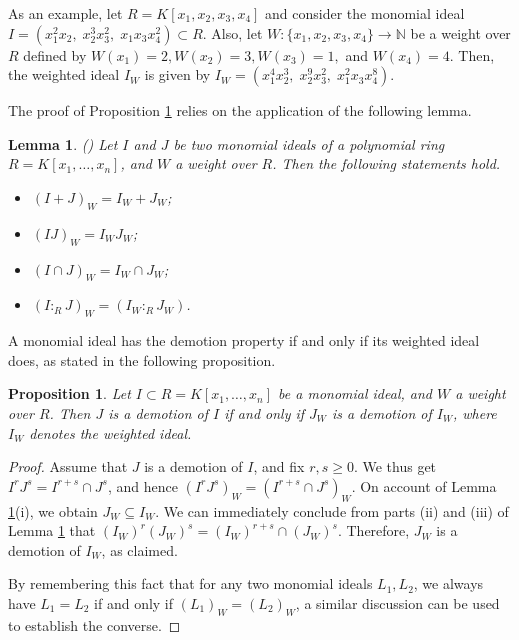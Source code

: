 \documentclass[11pt]{amsart}
\newtheorem{lemma}[theorem]{Lemma}
\newtheorem{proposition}[theorem]{Proposition}
\begin{document}

As an example,  let  $R = K[x_1, x_2, x_3, x_4]$ and consider the monomial ideal $I = (x_1^2x_2,\; x_2^3x_3^2,\; x_1x_3x_4^2) \subset R.$ 
 Also, let $W : \{x_1, x_2, x_3, x_4\} \rightarrow \mathbb{N}$  be a weight over $R$ defined by 
$W(x_1)=2,   W(x_2)=3,  W(x_3)=1,$ and $W(x_4)=4.$  Then, the weighted ideal $I_W$ is given by 
$I_W = (x_1^4x_2^3,\; x_2^9x_3^2,\; x_1^2x_3x_4^8).$

\bigskip
The proof of  Proposition \ref{PRO.Weighting} relies on the application of the following lemma.  

\begin{lemma}\label{LEM. Weighted} (\cite[Lemma 3.5]{SN})
Let $I$ and $J$ be two monomial ideals of a polynomial ring $R=K[x_1, \ldots, x_n]$, and $W$ a weight over $R$. Then the following statements hold. 
\begin {itemize}
\item[(i)] $(I+J)_W= I_W + J_W$;
\item[(ii)] $(IJ)_W= I_W J_W$;
\item[(iii)] $(I\cap J)_W= I_W \cap J_W$;
\item[(iv)] $(I :_RJ)_W= (I_W :_R J_W)$.
\end{itemize}
\end{lemma}

 
 
 A monomial ideal has the demotion property if and only if its weighted ideal does, as stated in the following proposition.

\begin{proposition}\label{PRO.Weighting}
Let $I \subset R=K[x_1, \ldots, x_n]$  be a  monomial ideal,  and $W$ a weight over $R$.   Then $J$ is a demotion of $I$  if and only if 
 $J_W$ is a demotion of $I_W$, where $I_W$ denotes the weighted ideal.  
\end{proposition}
\begin{proof}
Assume that   $J$ is   a demotion of $I$, and fix $r,s\geq 0$. We thus get  $I^rJ^s=I^{r+s} \cap J^s$, and hence   $(I^rJ^s)_W=(I^{r+s} \cap J^s)_W$. 
On account of  Lemma  \ref{LEM. Weighted}(i), we obtain   $J_W \subseteq I_W$.  We can immediately conclude from parts (ii) and (iii) of 
 Lemma  \ref{LEM. Weighted} that   $(I_W)^r(J_W)^s=(I_W)^{r+s} \cap (J_W)^s$. Therefore,  $J_W$ is a demotion of $I_W$, as claimed. 
  
By remembering  this fact that for any two monomial  ideals $L_1, L_2$, we always have $L_1=L_2$ if and only if 
 $(L_1)_W=(L_2)_W$, a similar discussion can be used to  establish the converse.
\end{proof} 
\end{document}
